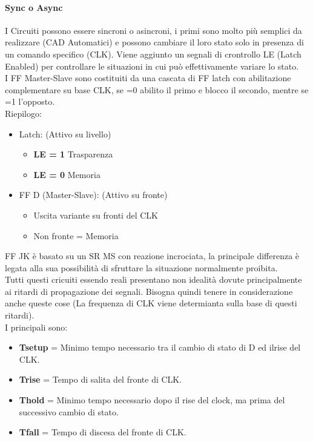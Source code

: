 \documentclass[12pt]{article}
\begin{document}
\paragraph{Sync o Async} I Circuiti possono essere sincroni o asincroni, i primi sono molto più semplici da realizzare (CAD Automatici) e possono cambiare il loro stato solo in presenza di un comando specifico (CLK). Viene aggiunto un segnali di crontrollo LE (Latch Enabled) per controllare le situazioni in cui può effettivamente variare lo stato.\\
I FF Master-Slave sono costituiti da una cascata di FF latch con abilitazione complementare su base CLK, se =0 abilito il primo e blocco il secondo, mentre se =1 l'opposto.\\
Riepilogo:
\begin{itemize}
  \item Latch: (Attivo su livello)
  \begin{itemize}
    \item \textbf{LE = 1} Trasparenza
    \item \textbf{LE = 0} Memoria
  \end{itemize}
  \item FF D (Master-Slave): (Attivo su fronte)
  \begin{itemize}
    \item Uscita variante su fronti del CLK
    \item Non fronte = Memoria
  \end{itemize}
\end{itemize}
FF JK è basato su un SR MS con reazione incrociata, la principale differenza è legata alla sua possibilità di sfruttare la situazione normalmente proibita.\\
Tutti questi cricuiti essendo reali presentano non idealità dovute principalmente ai ritardi di propagazione dei segnali. Bisogna quindi tenere in considerazione anche queste cose (La frequenza di CLK viene determianta sulla base di questi ritardi).\\
I principali sono:
\begin{itemize}
  \item \textbf{Tsetup} = Minimo tempo necessario tra il cambio di stato di D ed ilrise del CLK.
  \item \textbf{Trise} = Tempo di salita del fronte di CLK.
  \item \textbf{Thold} = Minimo tempo necessario dopo il rise del clock, ma prima del successivo cambio di stato.
  \item \textbf{Tfall} = Tempo di discesa del fronte di CLK.
\end{itemize}
\end{document}
